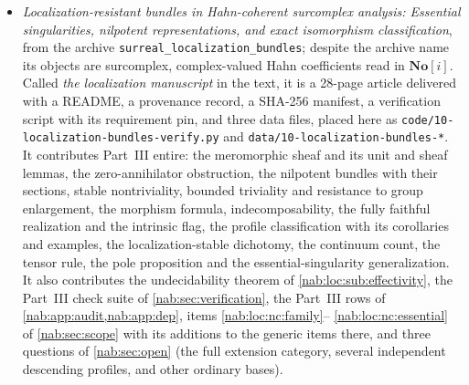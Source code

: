 \documentclass[11pt,letterpaper]{article}
\theoremstyle{definition}
\theoremstyle{remark}
\newcommand{\No}{\mathbf{No}}
\numberwithin{equation}{section}
\begin{document}
\begin{itemize}
\item \emph{Localization-resistant bundles in Hahn-coherent surcomplex
analysis: Essential singularities, nilpotent representations, and exact
isomorphism classification}, from the archive
\texttt{surreal\_localization\_bundles}; despite the archive name its objects
are surcomplex, complex-valued Hahn coefficients read in $\No[i]$. Called
\emph{the localization manuscript} in the text, it is a 28-page article
delivered with a README, a provenance record, a SHA-256 manifest, a
verification script with its requirement pin, and three data files, placed
here as \nolinkurl{code/10-localization-bundles-verify.py} and
\nolinkurl{data/10-localization-bundles-*}. It contributes Part~III entire: the
meromorphic sheaf and its unit and sheaf lemmas, the zero-annihilator
obstruction, the nilpotent bundles with their sections, stable nontriviality,
bounded triviality and resistance to group enlargement, the morphism formula,
indecomposability, the fully faithful realization and the intrinsic flag, the
profile classification with its corollaries and examples, the
localization-stable dichotomy, the continuum count, the tensor rule, the pole
proposition and the essential-singularity generalization. It also contributes
the undecidability theorem of \cref{nab:loc:sub:effectivity}, the Part~III
check suite of \cref{nab:sec:verification}, the Part~III rows of
\cref{nab:app:audit,nab:app:dep}, items \ref{nab:loc:nc:family}--%
\ref{nab:loc:nc:essential} of \cref{nab:sec:scope} with its additions to the
generic items there, and three questions of \cref{nab:sec:open} (the full
extension category, several independent descending profiles, and other
ordinary bases).


\end{itemize}
\end{document}
